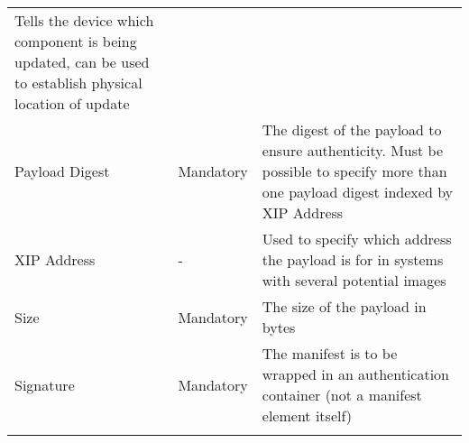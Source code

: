 \begin{longtable}[]{@{}lll@{}}
\begin{minipage}[t]{0.42\columnwidth}
Tells the device which component is being updated, can be used to
establish physical location of update\strut
\end{minipage}\tabularnewline
\begin{minipage}[t]{0.23\columnwidth}\raggedright\strut
Payload Digest\strut
\end{minipage} & \begin{minipage}[t]{0.26\columnwidth}\raggedright\strut
Mandatory\strut
\end{minipage} & \begin{minipage}[t]{0.42\columnwidth}\raggedright\strut
The digest of the payload to ensure authenticity. Must be possible to
specify more than one payload digest indexed by XIP Address\strut
\end{minipage}\tabularnewline
\begin{minipage}[t]{0.23\columnwidth}\raggedright\strut
XIP Address\strut
\end{minipage} & \begin{minipage}[t]{0.26\columnwidth}\raggedright\strut
-\strut
\end{minipage} & \begin{minipage}[t]{0.42\columnwidth}\raggedright\strut
Used to specify which address the payload is for in systems with several
potential images\strut
\end{minipage}\tabularnewline
\begin{minipage}[t]{0.23\columnwidth}\raggedright\strut
Size\strut
\end{minipage} & \begin{minipage}[t]{0.26\columnwidth}\raggedright\strut
Mandatory\strut
\end{minipage} & \begin{minipage}[t]{0.42\columnwidth}\raggedright\strut
The size of the payload in bytes\strut
\end{minipage}\tabularnewline
\begin{minipage}[t]{0.23\columnwidth}\raggedright\strut
Signature\strut
\end{minipage} & \begin{minipage}[t]{0.26\columnwidth}\raggedright\strut
Mandatory\strut
\end{minipage} & \begin{minipage}[t]{0.42\columnwidth}\raggedright\strut
The manifest is to be wrapped in an authentication container (not a
manifest element itself)\strut
\end{minipage}\tabularnewline
\begin{minipage}[t]{0.23\columnwidth}\raggedright\strut

\end{minipage}
\end{longtable}
